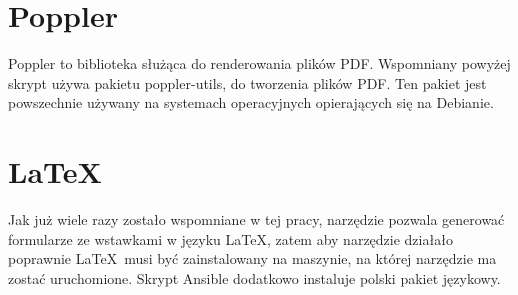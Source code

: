 \section{Poppler}
Poppler to biblioteka służąca do renderowania plików PDF. Wspomniany powyżej skrypt
używa pakietu poppler-utils, do tworzenia plików PDF. Ten pakiet jest powszechnie
używany na systemach operacyjnych opierających się na Debianie.

\section{LaTeX}
Jak już wiele razy zostało wspomniane w tej pracy, narzędzie pozwala generować formularze ze 
wstawkami
w języku \LaTeX, zatem aby narzędzie działało poprawnie \LaTeX\ musi być zainstalowany 
na maszynie, na której narzędzie ma zostać uruchomione. Skrypt Ansible dodatkowo instaluje
polski pakiet językowy.
